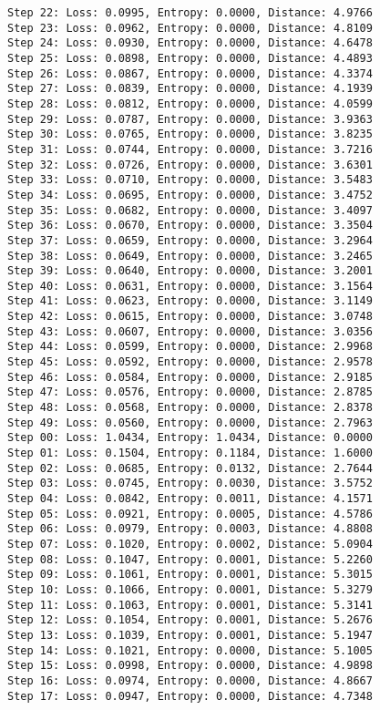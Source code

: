 \documentclass[11pt]{article}
\begin{document}
\begin{Verbatim}[commandchars=\\\{\}]
Step 22: Loss: 0.0995, Entropy: 0.0000, Distance: 4.9766
Step 23: Loss: 0.0962, Entropy: 0.0000, Distance: 4.8109
Step 24: Loss: 0.0930, Entropy: 0.0000, Distance: 4.6478
Step 25: Loss: 0.0898, Entropy: 0.0000, Distance: 4.4893
Step 26: Loss: 0.0867, Entropy: 0.0000, Distance: 4.3374
Step 27: Loss: 0.0839, Entropy: 0.0000, Distance: 4.1939
Step 28: Loss: 0.0812, Entropy: 0.0000, Distance: 4.0599
Step 29: Loss: 0.0787, Entropy: 0.0000, Distance: 3.9363
Step 30: Loss: 0.0765, Entropy: 0.0000, Distance: 3.8235
Step 31: Loss: 0.0744, Entropy: 0.0000, Distance: 3.7216
Step 32: Loss: 0.0726, Entropy: 0.0000, Distance: 3.6301
Step 33: Loss: 0.0710, Entropy: 0.0000, Distance: 3.5483
Step 34: Loss: 0.0695, Entropy: 0.0000, Distance: 3.4752
Step 35: Loss: 0.0682, Entropy: 0.0000, Distance: 3.4097
Step 36: Loss: 0.0670, Entropy: 0.0000, Distance: 3.3504
Step 37: Loss: 0.0659, Entropy: 0.0000, Distance: 3.2964
Step 38: Loss: 0.0649, Entropy: 0.0000, Distance: 3.2465
Step 39: Loss: 0.0640, Entropy: 0.0000, Distance: 3.2001
Step 40: Loss: 0.0631, Entropy: 0.0000, Distance: 3.1564
Step 41: Loss: 0.0623, Entropy: 0.0000, Distance: 3.1149
Step 42: Loss: 0.0615, Entropy: 0.0000, Distance: 3.0748
Step 43: Loss: 0.0607, Entropy: 0.0000, Distance: 3.0356
Step 44: Loss: 0.0599, Entropy: 0.0000, Distance: 2.9968
Step 45: Loss: 0.0592, Entropy: 0.0000, Distance: 2.9578
Step 46: Loss: 0.0584, Entropy: 0.0000, Distance: 2.9185
Step 47: Loss: 0.0576, Entropy: 0.0000, Distance: 2.8785
Step 48: Loss: 0.0568, Entropy: 0.0000, Distance: 2.8378
Step 49: Loss: 0.0560, Entropy: 0.0000, Distance: 2.7963
Step 00: Loss: 1.0434, Entropy: 1.0434, Distance: 0.0000
Step 01: Loss: 0.1504, Entropy: 0.1184, Distance: 1.6000
Step 02: Loss: 0.0685, Entropy: 0.0132, Distance: 2.7644
Step 03: Loss: 0.0745, Entropy: 0.0030, Distance: 3.5752
Step 04: Loss: 0.0842, Entropy: 0.0011, Distance: 4.1571
Step 05: Loss: 0.0921, Entropy: 0.0005, Distance: 4.5786
Step 06: Loss: 0.0979, Entropy: 0.0003, Distance: 4.8808
Step 07: Loss: 0.1020, Entropy: 0.0002, Distance: 5.0904
Step 08: Loss: 0.1047, Entropy: 0.0001, Distance: 5.2260
Step 09: Loss: 0.1061, Entropy: 0.0001, Distance: 5.3015
Step 10: Loss: 0.1066, Entropy: 0.0001, Distance: 5.3279
Step 11: Loss: 0.1063, Entropy: 0.0001, Distance: 5.3141
Step 12: Loss: 0.1054, Entropy: 0.0001, Distance: 5.2676
Step 13: Loss: 0.1039, Entropy: 0.0001, Distance: 5.1947
Step 14: Loss: 0.1021, Entropy: 0.0000, Distance: 5.1005
Step 15: Loss: 0.0998, Entropy: 0.0000, Distance: 4.9898
Step 16: Loss: 0.0974, Entropy: 0.0000, Distance: 4.8667
Step 17: Loss: 0.0947, Entropy: 0.0000, Distance: 4.7348

\end{Verbatim}
\end{document}
